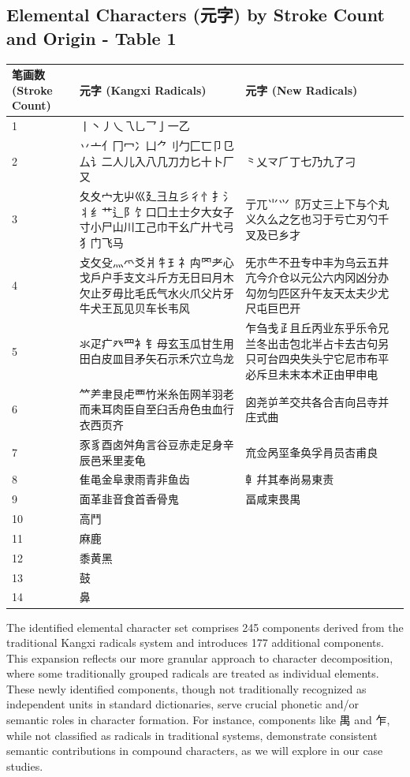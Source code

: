 \documentclass[11pt,letterpaper]{article}
\begin{document}
\subsection{Elemental Characters (元字) by Stroke Count and Origin -
Table
1}\label{elemental-characters-ux5143ux5b57-by-stroke-count-and-origin---table-1}

\begin{longtable}{|p{1.5cm}|p{6.5cm}|p{6.5cm}|}
\hline
\textbf{笔画数 (Stroke Count)} & \textbf{元字 (Kangxi Radicals)} & \textbf{元字 (New Radicals)} \\
\hline
1 & 丨丶丿乀乁乚乛亅一乙 & \\
\hline
2 & 丷亠亻冂冖冫凵⺈刂勹匚匸卩㔾厶讠二人儿入八几刀力匕十卜厂又 &
⺀乂龴⺁丁七乃九了刁 \\
\hline
3 &
夂夊宀尢屮巛廴彐彑彡彳忄扌氵丬纟艹辶阝饣口囗土士夕大女子寸小尸山川工己巾干幺广廾弋弓犭门飞马
& 亍兀⺌⺍⻏万丈三上下与个丸义久么之乞也习于亏亡刃勺千叉及已乡才 \\
\hline
4 &
攴攵殳灬爫爻爿牜⺩礻禸罓耂心戈戶户手支文斗斤方无日曰月木欠止歹毋比毛氏气水火爪父片牙牛犬王瓦见贝车长韦风
&
旡朩⺧不丑专中丰为乌云五井亢今介仓以元公六内冈凶分办勾勿匀匹区升午友天太夫少尤尺屯巨巴开 \\
\hline
5 & 氺疋疒癶罒衤钅母玄玉瓜甘生用田白皮皿目矛矢石示禾穴立鸟龙 &
乍刍戋𤴔且丘丙业东乎乐令兄兰冬出击包北半占卡去古句另只可台四央失头宁它尼市布平必斥旦未末本术正由甲申电 \\
\hline
6 & ⺮⺶聿艮虍覀竹米糸缶网羊羽老而耒耳肉臣自至臼舌舟色虫血行衣西页齐 &
囟尧屰⺷交共各合吉向吕寺并庄式曲 \\
\hline
7 & 豕豸酉卤舛角言谷豆赤走足身辛辰邑釆里麦龟 &
㐬佥呙坙夆奂孚肙员㕻甫良 \\
\hline
8 & 隹黾金阜隶雨青非鱼齿 & 龺幷其奉尚易東责 \\
\hline
9 & 面革韭音食首香骨鬼 & 畐咸柬畏禺 \\
\hline
10 & 高鬥 & \\
\hline
11 & 麻鹿 & \\
\hline
12 & 黍黄黑 & \\
\hline
13 & 鼓 & \\
\hline
14 & 鼻 & \\
\hline
\end{longtable}

The identified elemental character set comprises 245 components derived
from the traditional Kangxi radicals system and introduces 177
additional components. This expansion reflects our more granular
approach to character decomposition, where some traditionally grouped
radicals are treated as individual elements. These newly identified
components, though not traditionally recognized as independent units in
standard dictionaries, serve crucial phonetic and/or semantic roles in
character formation. For instance, components like 禺 and 乍, while not
classified as radicals in traditional systems, demonstrate consistent
semantic contributions in compound characters, as we will explore in our
case studies.
\end{document}
